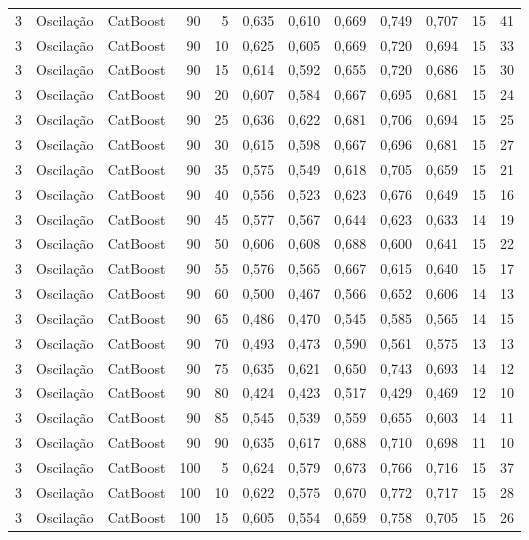 \begin{longtable}{@{}rllrrrrrrrrr@{}}
3 & Oscilação & CatBoost & 90 & 5 & 0,635 & 0,610 & 0,669 & 0,749 & 0,707 & 15 & 41 \\
3 & Oscilação & CatBoost & 90 & 10 & 0,625 & 0,605 & 0,669 & 0,720 & 0,694 & 15 & 33 \\
3 & Oscilação & CatBoost & 90 & 15 & 0,614 & 0,592 & 0,655 & 0,720 & 0,686 & 15 & 30 \\
3 & Oscilação & CatBoost & 90 & 20 & 0,607 & 0,584 & 0,667 & 0,695 & 0,681 & 15 & 24 \\
3 & Oscilação & CatBoost & 90 & 25 & 0,636 & 0,622 & 0,681 & 0,706 & 0,694 & 15 & 25 \\
3 & Oscilação & CatBoost & 90 & 30 & 0,615 & 0,598 & 0,667 & 0,696 & 0,681 & 15 & 27 \\
3 & Oscilação & CatBoost & 90 & 35 & 0,575 & 0,549 & 0,618 & 0,705 & 0,659 & 15 & 21 \\
3 & Oscilação & CatBoost & 90 & 40 & 0,556 & 0,523 & 0,623 & 0,676 & 0,649 & 15 & 16 \\
3 & Oscilação & CatBoost & 90 & 45 & 0,577 & 0,567 & 0,644 & 0,623 & 0,633 & 14 & 19 \\
3 & Oscilação & CatBoost & 90 & 50 & 0,606 & 0,608 & 0,688 & 0,600 & 0,641 & 15 & 22 \\
3 & Oscilação & CatBoost & 90 & 55 & 0,576 & 0,565 & 0,667 & 0,615 & 0,640 & 15 & 17 \\
3 & Oscilação & CatBoost & 90 & 60 & 0,500 & 0,467 & 0,566 & 0,652 & 0,606 & 14 & 13 \\
3 & Oscilação & CatBoost & 90 & 65 & 0,486 & 0,470 & 0,545 & 0,585 & 0,565 & 14 & 15 \\
3 & Oscilação & CatBoost & 90 & 70 & 0,493 & 0,473 & 0,590 & 0,561 & 0,575 & 13 & 13 \\
3 & Oscilação & CatBoost & 90 & 75 & 0,635 & 0,621 & 0,650 & 0,743 & 0,693 & 14 & 12 \\
3 & Oscilação & CatBoost & 90 & 80 & 0,424 & 0,423 & 0,517 & 0,429 & 0,469 & 12 & 10 \\
3 & Oscilação & CatBoost & 90 & 85 & 0,545 & 0,539 & 0,559 & 0,655 & 0,603 & 14 & 11 \\
3 & Oscilação & CatBoost & 90 & 90 & 0,635 & 0,617 & 0,688 & 0,710 & 0,698 & 11 & 10 \\
3 & Oscilação & CatBoost & 100 & 5 & 0,624 & 0,579 & 0,673 & 0,766 & 0,716 & 15 & 37 \\
3 & Oscilação & CatBoost & 100 & 10 & 0,622 & 0,575 & 0,670 & 0,772 & 0,717 & 15 & 28 \\
3 & Oscilação & CatBoost & 100 & 15 & 0,605 & 0,554 & 0,659 & 0,758 & 0,705 & 15 & 26 \\

\end{longtable}
